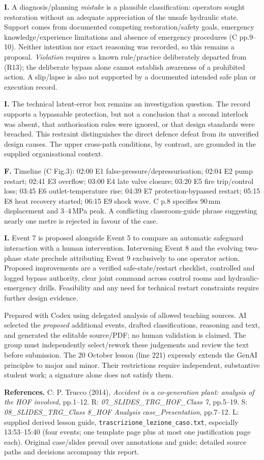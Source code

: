 \documentclass[10pt,a4paper]{article}
\newcommand{\sect}[1]{\par\vspace{2mm}{\bfseries\color{ink}#1}\par}
\begin{document}
\textbf{I.} A diagnosis/planning \emph{mistake} is a plausible classification: operators sought restoration without an adequate appreciation of the unsafe hydraulic state. Support comes from documented competing restoration/safety goals, emergency knowledge/experience limitations and absence of emergency procedures (C pp.9--10). Neither intention nor exact reasoning was recorded, so this remains a proposal. \emph{Violation} requires a known rule/practice deliberately departed from (R13); the deliberate bypass alone cannot establish awareness of a prohibited action. A slip/lapse is also not supported by a documented intended safe plan or execution record.

\textbf{I.} The technical latent-error box remains an investigation question. The record supports a bypassable protection, but not a conclusion that a second interlock was absent, that authorisation rules were ignored, or that design standards were breached. This restraint distinguishes the direct defence defeat from its unverified design causes. The upper cross-path conditions, by contrast, are grounded in the supplied organisational context.
\sect{Chronology and selection}
\textbf{F.} Timeline (C Fig.3): 02:00 E1 false-pressure/depressurisation; 02:04 E2 pump restart; 02:41 E3 overflow; 03:00 E4 late valve closure; 03:20 E5 fire trip/control loss; 03:45 E6 outlet-temperature rise; 04:39 E7 protection-bypassed restart; 05:15 E8 heat recovery started; 06:15 E9 shock wave. C p.8 specifies 90\,mm displacement and 3--4\,MPa peak. A conflicting classroom-guide phrase suggesting nearly one metre is rejected in favour of the case.

\textbf{I.} Event 7 is proposed alongside Event 5 to compare an automatic safeguard interaction with a human intervention. Intervening Event 8 and the evolving two-phase state preclude attributing Event 9 exclusively to one operator action. Proposed improvements are a verified safe-state/restart checklist, controlled and logged bypass authority, clear joint command across control rooms and hydraulic-emergency drills. Feasibility and any need for technical restart constraints require further design evidence.
\sect{Use status, sources and GenAI disclosure}
Prepared with Codex using delegated analysis of allowed teaching sources. AI selected the \emph{proposed} additional events, drafted classifications, reasoning and text, and generated the editable source/PDF; no human validation is claimed. The group must independently select/rework these judgements and review the text before submission. The 20 October lesson (line 221) expressly extends the GenAI principles to major and minor. Their restrictions require independent, substantive student work; a signature alone does not satisfy them.

\textbf{References.} C: P. Trucco (2014), \emph{Accident in a co-generation plant: analysis of the HOF involved}, pp.1--12. R: \emph{07\_SLIDES\_TRG\_HOF\_Class 7}, pp.5--19. S: \emph{08\_SLIDES\_TRG\_Class 8\_HOF Analysis case\_Presentation}, pp.7--12. L: supplied derived lesson guide, \texttt{trascrizione\_lezione\_caso.txt}, especially 13:53--15:40 (four events; one template page plus at most one justification page each). Original case/slides prevail over annotations and guide; detailed source paths and decisions accompany this report.
\end{document}
